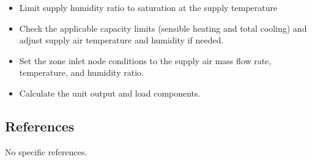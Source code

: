 \begin{itemize}
  \item Limit supply humidity ratio to saturation at the supply temperature
  \item Check the applicable capacity limits (sensible heating and total cooling) and adjust supply air temperature and humidity if needed.
  \item Set the zone inlet node conditions to the supply air mass flow rate, temperature, and humidity ratio.
  \item Calculate the unit output and load components.
\end{itemize}

\subsection{References}\label{references-029}

No specific references.
